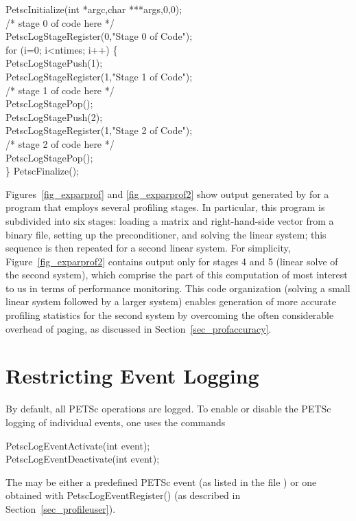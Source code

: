 {{\begin{tabbing}
   PetscInitialize(int *argc,char ***args,0,0);\\
   /* stage 0 of code here */\\
   PetscLogStageRegister(0,"Stage 0 of Code");\\
   for (i=0; i<ntimes; i++) \{\\
      PetscLogStagePush(1);\\
      PetscLogStageRegister(1,"Stage 1 of Code");\\
      /* stage 1 of code here */\\
      PetscLogStagePop();\\
      PetscLogStagePush(2);\\
      PetscLogStageRegister(1,"Stage 2 of Code");\\
      /* stage 2 of code here */\\
      PetscLogStagePop();\\
   \}
   PetscFinalize();
\end{tabbing}

Figures~\ref{fig_exparprof} and \ref{fig_exparprof2} show output
generated by  for a program that employs
several profiling stages.  In particular, this program is
subdivided into six stages: loading a matrix and right-hand-side
vector from a binary file, setting up the preconditioner, and solving
the linear system; this sequence is then repeated for a second linear
system.  For simplicity, Figure~\ref{fig_exparprof2} contains output
only for stages 4 and 5 (linear solve of the second system), which comprise
the part of this computation of most interest to us in terms of
performance monitoring.  This code organization (solving a small
linear system followed by a larger system) enables generation of more
accurate profiling statistics for the second system by overcoming the
often considerable overhead of paging, as discussed in
Section~\ref{sec_profaccuracy}.

\section{Restricting Event Logging}
\label{sec_deactivate}

By default, all PETSc operations are logged.
To enable or disable the PETSc logging of individual events, one uses the commands
\begin{tabbing}
   PetscLogEventActivate(int event);\\
   PetscLogEventDeactivate(int event);
\end{tabbing}
The  may be either a predefined PETSc event (as listed in
the file ) or one obtained with
PetscLogEventRegister() (as described in Section~\ref{sec_profileuser}).

}}
